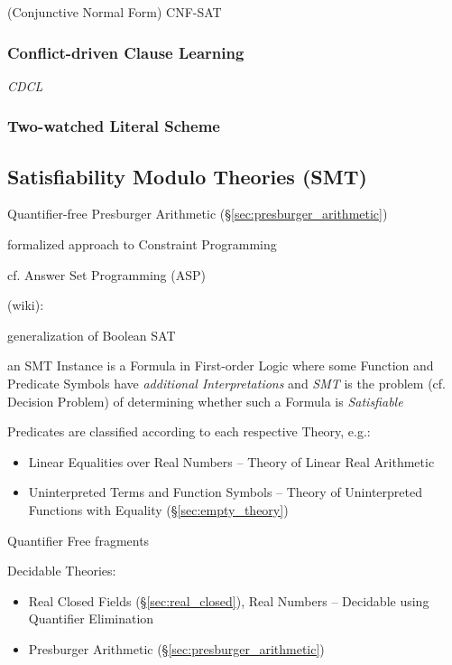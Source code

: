 (Conjunctive Normal Form) CNF-SAT



\subsubsection{Conflict-driven Clause Learning}\label{sec:cdcl}\hfill

\emph{CDCL}



\subsubsection{Two-watched Literal Scheme}\label{sec:twowatched_literal}\hfill



\subsection{Satisfiability Modulo Theories (SMT)}\label{sec:smt}

Quantifier-free Presburger Arithmetic
(\S\ref{sec:presburger_arithmetic})

formalized approach to Constraint Programming

cf. Answer Set Programming (ASP)

(wiki):

generalization of Boolean SAT

an SMT Instance is a Formula in First-order Logic where some Function
and Predicate Symbols have \emph{additional Interpretations} and
\emph{SMT} is the problem (cf. Decision Problem) of determining
whether such a Formula is \emph{Satisfiable}

Predicates are classified according to each respective Theory, e.g.:
\begin{itemize}
  \item Linear Equalities over Real Numbers -- Theory of Linear Real
    Arithmetic
  \item Uninterpreted Terms and Function Symbols -- Theory of
    Uninterpreted Functions with Equality (\S\ref{sec:empty_theory})
\end{itemize}

Quantifier Free fragments

Decidable Theories: %
\begin{itemize}
  \item Real Closed Fields (\S\ref{sec:real_closed}), Real Numbers --
    Decidable using Quantifier Elimination
  \item Presburger Arithmetic (\S\ref{sec:presburger_arithmetic})
\end{itemize}

